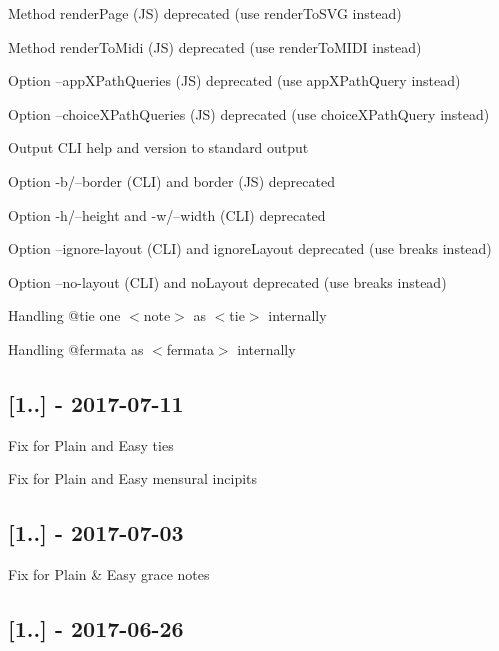 \begin{DoxyItemize}
\item Method render\+Page (JS) deprecated (use render\+To\+S\+VG instead)
\item Method render\+To\+Midi (JS) deprecated (use render\+To\+M\+I\+DI instead)
\item Option --app\+X\+Path\+Queries (JS) deprecated (use app\+X\+Path\+Query instead)
\item Option --choice\+X\+Path\+Queries (JS) deprecated (use choice\+X\+Path\+Query instead)
\item Output C\+LI help and version to standard output
\item Option -\/b/--border (C\+LI) and border (JS) deprecated
\item Option -\/h/--height and -\/w/--width (C\+LI) deprecated
\item Option --ignore-\/layout (C\+LI) and ignore\+Layout deprecated (use breaks instead)
\item Option --no-\/layout (C\+LI) and no\+Layout deprecated (use breaks instead)
\item Handling {\ttfamily @tie} one {\ttfamily $<$note$>$} as {\ttfamily $<$tie$>$} internally
\item Handling {\ttfamily @fermata} as {\ttfamily $<$fermata$>$} internally
\end{DoxyItemize}

\subsection*{\mbox{[}1..\mbox{]} -\/ 2017-\/07-\/11}


\begin{DoxyItemize}
\item Fix for Plain and Easy ties
\item Fix for Plain and Easy mensural incipits
\end{DoxyItemize}

\subsection*{\mbox{[}1..\mbox{]} -\/ 2017-\/07-\/03}


\begin{DoxyItemize}
\item Fix for Plain \& Easy grace notes
\end{DoxyItemize}

\subsection*{\mbox{[}1..\mbox{]} -\/ 2017-\/06-\/26}



